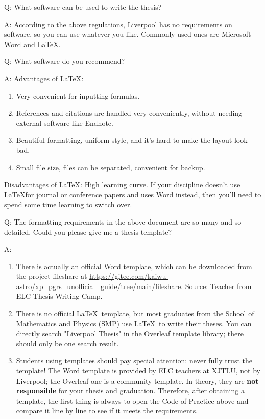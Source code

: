 Q: What software can be used to write the thesis?

A: According to the above regulations, Liverpool has no requirements on software, so you can use whatever you like. Commonly used ones are Microsoft Word and \LaTeX.

Q: What software do you recommend?

A: Advantages of \LaTeX:
\begin{enumerate}
    \item Very convenient for inputting formulas.
    \item References and citations are handled very conveniently, without needing external software like Endnote.
    \item Beautiful formatting, uniform style, and it's hard to make the layout look bad.
    \item Small file size, files can be separated, convenient for backup.
\end{enumerate}
Disadvantages of \LaTeX: High learning curve. If your discipline doesn't use \LaTeX for journal or conference papers and uses Word instead, then you'll need to spend some time learning to switch over.

Q: The formatting requirements in the above document are so many and so detailed. Could you please give me a thesis template?

A:
\begin{enumerate}
    \item There is actually an official Word template, which can be downloaded from the project fileshare at \url{https://gitee.com/kaiwu-astro/xp_pgrs_unofficial_guide/tree/main/fileshare}. Source: Teacher from ELC Thesis Writing Camp.
    \item There is no official \LaTeX\ template, but most graduates from the School of Mathematics and Physics (SMP) use \LaTeX\ to write their theses. You can directly search "Liverpool Thesis" in the Overleaf template library; there should only be one search result.
    \item Students using templates should pay special attention: never fully trust the template! The Word template is provided by ELC teachers at XJTLU, not by Liverpool; the Overleaf one is a community template. In theory, they are \textbf{not responsible} for your thesis and graduation. Therefore, after obtaining a template, the first thing is always to open the Code of Practice above and compare it line by line to see if it meets the requirements.
\end{enumerate}

